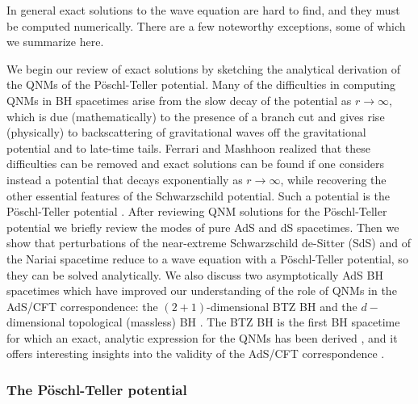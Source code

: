\documentclass[]{iopart}
\begin{document}
In general exact solutions to the wave equation are hard to find, and they
must be computed numerically. There are a few noteworthy exceptions, some of
which we summarize here.

We begin our review of exact solutions by sketching the analytical derivation
of the QNMs of the P\"oschl-Teller potential. Many of the difficulties in
computing QNMs in BH spacetimes arise from the slow decay of the potential as
$r\to \infty$, which is due (mathematically) to the presence of a branch cut
and gives rise (physically) to backscattering of gravitational waves off the
gravitational potential and to late-time tails.  Ferrari and Mashhoon realized
that these difficulties can be removed and exact solutions can be found if one
considers instead a potential that decays exponentially as $r\to \infty$,
while recovering the other essential features of the Schwarzschild
potential. Such a potential is the P\"oschl-Teller potential
\cite{Ferrari:1984zz}. After reviewing QNM solutions for the P\"oschl-Teller
potential we briefly review the modes of pure AdS and dS spacetimes. Then we
show that perturbations of the near-extreme Schwarzschild de-Sitter (SdS) and
of the Nariai spacetime reduce to a wave equation with a P\"oschl-Teller
potential, so they can be solved analytically.  We also discuss two
asymptotically AdS BH spacetimes which have improved our understanding of the
role of QNMs in the AdS/CFT correspondence: the $(2+1)$-dimensional BTZ BH
\cite{Banados:1992wn} and the $d-$dimensional topological (massless) BH
\cite{Lemos:1994fn,Lemos:1994xp,Lemos:1995cm,Mann:1996gj,Vanzo:1997gw,Birmingham:1998nr}.
The BTZ BH is the first BH spacetime for which an exact, analytic expression
for the QNMs has been derived \cite{Cardoso:2001hn}, and it offers interesting
insights into the validity of the AdS/CFT correspondence
\cite{Birmingham:2001pj,Sachs:2008gt,Sachs:2008yi}.

\subsubsection*{\label{sec:PT}The P\"oschl-Teller potential}
\end{document}
